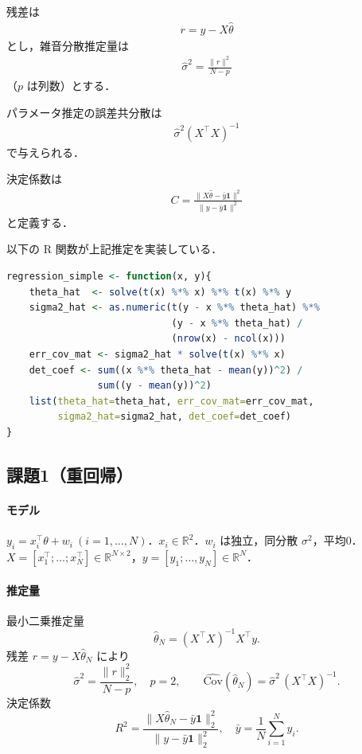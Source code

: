 残差は
\begin{align}
 r = y - X\hat{\theta}
\end{align}
とし，雑音分散推定量は
\begin{align}
 \hat{\sigma}^2 = \frac{\lVert r \rVert^2}{N - p}
\end{align}
（$p$ は列数）とする．

パラメータ推定の誤差共分散は
\begin{align}
 \hat{\sigma}^2 (X^\top X)^{-1}
\end{align}
で与えられる．

決定係数は
\begin{align}
 C = \frac{\lVert X\hat{\theta} - \bar{y}\mathbf{1} \rVert^2}
          {\lVert y - \bar{y}\mathbf{1} \rVert^2}
\end{align}
と定義する．

以下の R 関数が上記推定を実装している．

\begin{lstlisting}[language=R]
regression_simple <- function(x, y){
    theta_hat  <- solve(t(x) %*% x) %*% t(x) %*% y
    sigma2_hat <- as.numeric(t(y - x %*% theta_hat) %*%
                             (y - x %*% theta_hat) /
                             (nrow(x) - ncol(x)))
    err_cov_mat <- sigma2_hat * solve(t(x) %*% x)
    det_coef <- sum((x %*% theta_hat - mean(y))^2) /
                sum((y - mean(y))^2)
    list(theta_hat=theta_hat, err_cov_mat=err_cov_mat,
         sigma2_hat=sigma2_hat, det_coef=det_coef)
}
\end{lstlisting}


\subsection{課題1（重回帰）}

\paragraph{モデル}
$y_i = x_i^\top \theta + w_i \ (i=1,\dots,N)$．$x_i\in\mathbb{R}^2$．$w_i$ は独立，同分散 $\sigma^2$，平均0．
$X=[x_1^\top;\dots;x_N^\top]\in\mathbb{R}^{N\times2}$，$y=[y_1;\dots,y_N]\in\mathbb{R}^N$．

\paragraph{推定量}
最小二乗推定量
\[
\hat\theta_N=(X^\top X)^{-1}X^\top y .
\]
残差 $r=y-X\hat\theta_N$ により
\[
\hat\sigma^2=\frac{\|r\|_2^2}{N-p},\quad p=2, \qquad
\widehat{\mathrm{Cov}}(\hat\theta_N)=\hat\sigma^2\,(X^\top X)^{-1}.
\]
決定係数
\[
R^2=\frac{\|X\hat\theta_N-\bar y\mathbf{1}\|_2^2}{\|y-\bar y\mathbf{1}\|_2^2},\quad
\bar y=\frac1N\sum_{i=1}^N y_i .
\]

